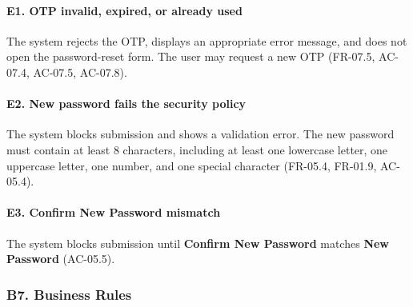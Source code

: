 \documentclass[12pt]{article}
\begin{document}
\hypertarget{sec:e1-otp-invalid-expired-or-already-used}{}
\paragraph*{E1. OTP invalid, expired, or already used}
\par\medskip

The system rejects the OTP, displays an appropriate error message, and does not open the password-reset form. The user may request a new OTP (FR-07.5, AC-07.4, AC-07.5, AC-07.8).
\par\medskip

\hypertarget{sec:e2-new-password-fails-the-security-policy}{}
\paragraph*{E2. New password fails the security policy}
\par\medskip

The system blocks submission and shows a validation error. The new password must contain at least 8 characters, including at least one lowercase letter, one uppercase letter, one number, and one special character (FR-05.4, FR-01.9, AC-05.4).
\par\medskip

\hypertarget{sec:e3-confirm-new-password-mismatch}{}
\paragraph*{E3. Confirm New Password mismatch}
\par\medskip

The system blocks submission until \textbf{Confirm New Password} matches \textbf{New Password} (AC-05.5).
\par\medskip

\hypertarget{sec:b7-business-rules}{}
\subsubsection*{B7. Business Rules}
\par\medskip
\end{document}
